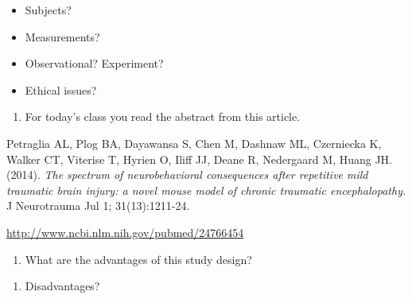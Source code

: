 \documentclass[
]{report}
\providecommand{\tightlist}{%
  \setlength{\itemsep}{0pt}\setlength{\parskip}{0pt}}
\begin{document}
\begin{itemize}
\tightlist
\item
  Subjects?
\end{itemize}

\vspace{0.5in}

\begin{itemize}
\tightlist
\item
  Measurements?
\end{itemize}

\vspace{0.5in}

\begin{itemize}
\tightlist
\item
  Observational? Experiment?
\end{itemize}

\vspace{0.5in}

\begin{itemize}
\tightlist
\item
  Ethical issues?
\end{itemize}

\vspace{0.5in}
\newpage

\begin{enumerate}
\def\labelenumi{\arabic{enumi}.}
\setcounter{enumi}{2}
\tightlist
\item
  For today's class you read the abstract from this article.
\end{enumerate}

Petraglia AL, Plog BA, Dayawansa S, Chen M, Dashnaw ML, Czerniecka K, Walker CT, Viterise T, Hyrien O, Iliff JJ, Deane R, Nedergaard M, Huang JH. (2014). \emph{The spectrum of neurobehavioral consequences after repetitive mild traumatic brain injury: a novel mouse model of chronic traumatic encephalopathy.} J Neurotrauma Jul 1; 31(13):1211-24.

\url{http://www.ncbi.nlm.nih.gov/pubmed/24766454}

\begin{enumerate}
\def\labelenumi{\alph{enumi})}
\tightlist
\item
  What are the advantages of this study design?
\end{enumerate}

\vspace{0.5in}

\begin{enumerate}
\def\labelenumi{\alph{enumi})}
\setcounter{enumi}{1}
\tightlist
\item
  Disadvantages?
\end{enumerate}
\end{document}
